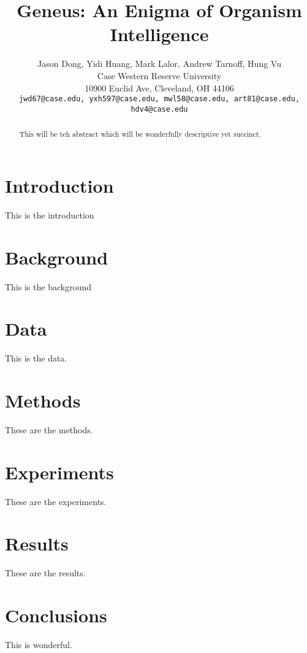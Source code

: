 \documentclass[10pt,twocolumn,letterpaper]{article}
\begin{document}
\title{Geneus: An Enigma of Organism Intelligence}

\author{Jason Dong, Yidi Huang, Mark Lalor, Andrew Tarnoff, Hung Vu \\
Case Western Reserve University\\
10900 Euclid Ave, Cleveland, OH 44106\\
{\tt\small jwd67@case.edu, yxh597@case.edu, mwl58@case.edu, art81@case.edu, hdv4@case.edu}}

\maketitle

\begin{abstract}
   This will be teh abstract which will be wonderfully descriptive yet succinct.
\end{abstract}

\section{Introduction}

This is the introduction \cite{Alpher02}

\section{Background}

This is the background \cite{Alpher04}

\section{Data}

This is the data. \cite{Authors14}

\section{Methods}

These are the methods.

\section{Experiments}

These are the experiments.

\section{Results}

These are the results.

\section{Conclusions}

This is wonderful.

{\small


}
\end{document}
